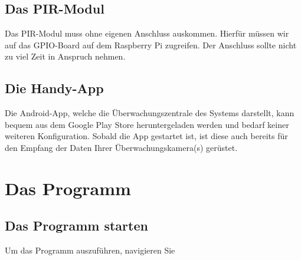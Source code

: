 \documentclass[12pt,a4paper]{scrreprt}
\begin{document}
\section{Das PIR-Modul}
Das PIR-Modul muss ohne eigenen Anschluss auskommen. Hierfür müssen wir auf das GPIO-Board auf dem Raspberry Pi zugreifen. Der Anschluss sollte nicht zu viel Zeit in Anspruch nehmen.\todo{}

\section{Die Handy-App}
Die Android-App, welche die Überwachungszentrale des Systems darstellt, kann bequem aus dem Google Play Store heruntergeladen werden und bedarf keiner weiteren Konfiguration. Sobald die App gestartet ist, ist diese auch bereits für den Empfang der Daten Ihrer Überwachungskamera(s) gerüstet.

\chapter{Das Programm}
\section{Das Programm starten}
Um das Programm auszuführen, navigieren Sie
\end{document}
